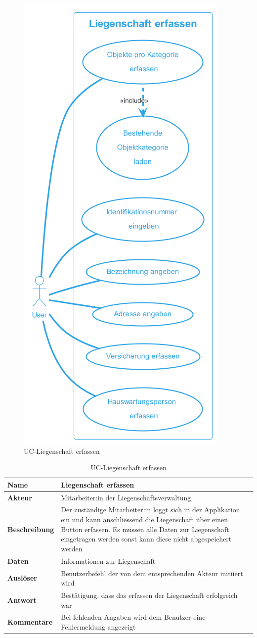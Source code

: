 \begin{figure}[H]
  \begin{center}
    \includegraphics[width=0.43\linewidth]{content/diagrams/out/usecase/liegenschaftErfassen/LiegenschaftErfassen.png}
    \caption{UC-Liegenschaft erfassen}
    \label{Liegenschaft}
  \end{center}
\end{figure}

\vspace*{-1cm}

\begin{table}[H]
  \centering
  \settowidth{}
  \setlength\extrarowheight{2pt}
  \begin{tabulary}{1.0\textwidth}{|a|m{14cm}|}
    \hline
    \textbf{Name}& Liegenschaft erfassen\\
    \hline
    \textbf{Akteur}& Mitarbeiter:in der Liegenschaftsverwaltung\\
    \hline 
    \textbf{Beschreibung} & Der zuständige Mitarbeiter:in loggt sich in der Applikation ein und kann anschliessend die Liegenschaft über einen Button erfassen. Es müssen alle Daten zur Liegenschaft eingetragen werden sonst kann diese nicht abgespeichert werden\\
    \hline
    \textbf{Daten} & Informationen zur Liegenschaft\\
    \hline
    \textbf{Auslöser} & Benutzerbefehl der von dem entsprechenden Akteur initiiert wird\\
    \hline
    \textbf{Antwort} & Bestätigung, dass das erfassen der Liegenschaft erfolgreich war\\
    \hline
    \textbf{Kommentare} & Bei fehlenden Angaben wird dem Benutzer eine Fehlermeldung angezeigt\\
    \hline
  \end{tabulary}
  \caption{UC-Liegenschaft erfassen}
\end{table}

